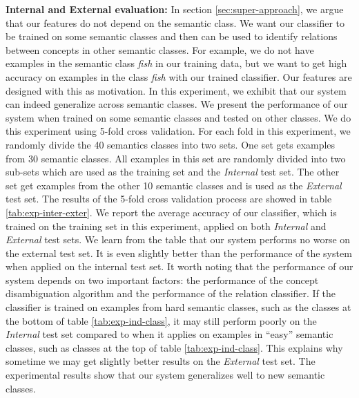 {{\bf Internal and External evaluation:} In section
\ref{sec:super-approach}, we argue that our features do not depend on
the semantic class.  We want our classifier to be trained on some
semantic classes and then can be used to identify relations between
concepts in other semantic classes. For example, we do not have
examples in the semantic class {\em fish} in our training data, but we
want to get high accuracy on examples in the class {\em fish} with our
trained classifier. Our features are designed with this as
motivation. In this experiment, we exhibit that our system can indeed
generalize across semantic classes. We present the performance of our
system when trained on some semantic classes and tested on other
classes. We do this experiment using 5-fold cross validation. For each
fold in this experiment, we randomly divide the 40 semantics classes
into two sets. One set gets examples from 30 semantic classes. All
examples in this set are randomly divided into two sub-sets which are
used as the training set and the {\em Internal} test set. The other
set get examples from the other 10 semantic classes and is used as the
{\em External} test set. The results of the 5-fold cross validation
process are showed in table \ref{tab:exp-inter-exter}. We report the
average accuracy of our classifier, which is trained on the training
set in this experiment, applied on both {\em Internal} and {\em
  External} test sets. We learn from the table that our system
performs no worse on the external test set. It is even slightly better
than the performance of the system when applied on the internal test
set. It worth noting that the performance of our system depends on two
important factors: the performance of the concept disambiguation
algorithm and the performance of the relation classifier. If the
classifier is trained on examples from hard semantic classes, such as
the classes at the bottom of table \ref{tab:exp-ind-class}, it may
still perform poorly on the {\em Internal} test set compared to when
it applies on examples in ``easy'' semantic classes, such as classes
at the top of table \ref{tab:exp-ind-class}. This explains why
sometime we may get slightly better results on the {\em External} test
set. The experimental results show that our system generalizes well to
new semantic classes.

}
